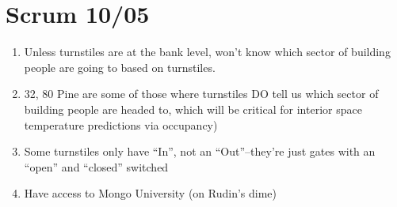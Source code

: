 \documentclass[12pt,a4paper]{article}
\begin{document}
\section{Scrum 10/05}
\begin{enumerate}
	\item Unless turnstiles are at the bank level, won't know which sector of 
	building people are going to based on turnstiles.
	\item 32, 80 Pine are some of 
	those where turnstiles DO tell us which sector of building people are 
	headed to, which will be critical for interior space temperature 
	predictions via occupancy)
	\item Some turnstiles only have ``In'', not an ``Out''--they're just gates 
	with an ``open'' and ``closed'' switched
	\item Have access to Mongo University (on Rudin's dime)
	
\end{enumerate}
\end{document}
